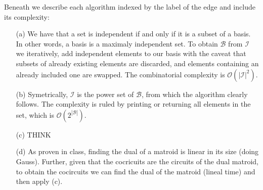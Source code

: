 Beneath we describe each algorithm indexed by the label of the edge and include its complexity:
\begin{itemize}
    \item[(a)] 
        We have that a set is independent if and only if it is a subset of a basis.
        In other words, a basis is a maximaly independent set.
        To obtain $\mathcal{B}$ from $\mathcal{I}$ we iteratively, add independent elements to our basis with the caveat that subsets of already existing elements are discarded, and elements containing an already included one are swapped.
        The combinatorial complexity is $\mathcal{O}(|\mathcal{I}|^2)$.
    \item[(b)] Symetrically, $\mathcal{I}$ is the power set of $\mathcal{B}$, from which the algorithm clearly follows. The complexity is ruled by printing or returning all elements in the set, which is $\mathcal{O}\left(2^{|\mathcal{B}|}\right)$.
    \item[(c)] THINK
    \item[(d)] As proven in class, finding the dual of a matroid is linear in its size (doing Gauss). Further, given that the cocricuits are the circuits of the dual matroid, to obtain the cocircuits we can find the dual of the matroid (lineal time) and then apply (c).
\end{itemize}
